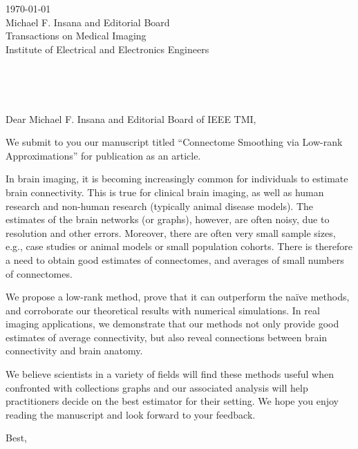 \documentclass[11pt]{letter} %
\def\opening#1{\thispagestyle{empty}
{\centering\fromaddress \vspace{0.75in} \\ %
} %
{\raggedright \toname \\ \toaddress \par} %
\vspace{0.3in} %
\noindent #1 %
}
\begin{document}
\begin{letter}{%
\today\\
\vspace{11pt}
Michael F. Insana and Editorial Board \\
Transactions on Medical Imaging\\
Institute of Electrical and Electronics Engineers
}


\opening{Dear Michael F. Insana and Editorial Board of IEEE TMI,}

We submit to you our manuscript titled ``Connectome Smoothing via Low-rank Approximations'' for publication as an article.


In brain imaging, it is becoming increasingly common for individuals to estimate brain connectivity.
This is true for clinical brain imaging, as well as human research and non-human research (typically animal disease models).
The estimates of the brain networks (or graphs), however, are often noisy, due to resolution and other errors.
Moreover, there are often very small sample sizes, e.g., case studies or animal models or small population cohorts.
There is therefore a need to obtain good estimates of connectomes, and averages of small numbers of connectomes.


We propose a low-rank method, prove that it can outperform the na\"ive methods, and corroborate our theoretical results with numerical simulations.
In real imaging applications, we demonstrate that our methods not only provide good estimates of average connectivity, but also reveal connections between brain connectivity and brain anatomy.


We believe scientists in a variety of fields will find these methods useful when confronted with collections graphs and our associated analysis will help practitioners decide on the best estimator for their setting.
We hope you enjoy reading the manuscript and look forward to your feedback.


\closing{Best,}


\end{letter}
\end{document}
